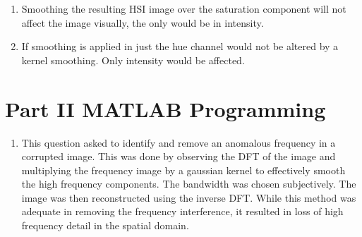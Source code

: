 \documentclass{article}[12 pt]
\begin{document}
\begin{enumerate}
\begin{enumerate}[label=\alph*]
		\item Smoothing the resulting HSI image over the saturation component will not affect the image visually, the only would be in intensity. 

		\item If smoothing is applied in just the hue channel would not be altered by a kernel smoothing.  Only intensity would be affected.
	\end{enumerate}

\end{enumerate}

\section*{Part II MATLAB Programming}
\begin{enumerate}
\item This question asked to identify and remove an anomalous frequency in a corrupted image.  This was done by observing the DFT of the image and multiplying the frequency image by a gaussian kernel to effectively smooth the high frequency components.  The bandwidth was chosen subjectively.  The image was then reconstructed using the inverse DFT.  While this method was adequate in removing the frequency interference, it resulted in loss of high frequency detail in the spatial domain.


\end{enumerate}
\end{document}
